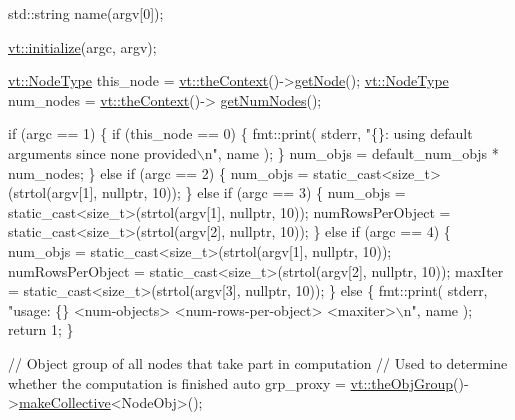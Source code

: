 \begin{DoxyCodeInclude}
  std::string name(argv[0]);

  \hyperlink{namespacevt_aaa266774ea8339c58be0202b00fafa62}{vt::initialize}(argc, argv);

  \hyperlink{namespacevt_a866da9d0efc19c0a1ce79e9e492f47e2}{vt::NodeType} this\_node = \hyperlink{namespacevt_a26551fe0e6e6a1371111df5b12c7e92c}{vt::theContext}()->\hyperlink{structvt_1_1ctx_1_1_context_a0d52c263ce8516546a67443d9a86fa5f}{getNode}();
  \hyperlink{namespacevt_a866da9d0efc19c0a1ce79e9e492f47e2}{vt::NodeType} num\_nodes = \hyperlink{namespacevt_a26551fe0e6e6a1371111df5b12c7e92c}{vt::theContext}()->
      \hyperlink{structvt_1_1ctx_1_1_context_a7f41071aadf6d5fa9e1b6c703c5ff19d}{getNumNodes}();

  \textcolor{keywordflow}{if} (argc == 1) \{
    \textcolor{keywordflow}{if} (this\_node == 0) \{
      fmt::print(
        stderr, \textcolor{stringliteral}{"\{\}: using default arguments since none provided\(\backslash\)n"}, name
      );
    \}
    num\_objs = default\_num\_objs * num\_nodes;
  \} \textcolor{keywordflow}{else} \textcolor{keywordflow}{if} (argc == 2) \{
    num\_objs = \textcolor{keyword}{static\_cast<}\textcolor{keywordtype}{size\_t}\textcolor{keyword}{>}(strtol(argv[1], \textcolor{keyword}{nullptr}, 10));
  \}
  \textcolor{keywordflow}{else} \textcolor{keywordflow}{if} (argc == 3) \{
    num\_objs = \textcolor{keyword}{static\_cast<}\textcolor{keywordtype}{size\_t}\textcolor{keyword}{>}(strtol(argv[1], \textcolor{keyword}{nullptr}, 10));
    numRowsPerObject = \textcolor{keyword}{static\_cast<}\textcolor{keywordtype}{size\_t}\textcolor{keyword}{>}(strtol(argv[2], \textcolor{keyword}{nullptr}, 10));
  \}
  \textcolor{keywordflow}{else} \textcolor{keywordflow}{if} (argc == 4) \{
    num\_objs = \textcolor{keyword}{static\_cast<}\textcolor{keywordtype}{size\_t}\textcolor{keyword}{>}(strtol(argv[1], \textcolor{keyword}{nullptr}, 10));
    numRowsPerObject = \textcolor{keyword}{static\_cast<}\textcolor{keywordtype}{size\_t}\textcolor{keyword}{>}(strtol(argv[2], \textcolor{keyword}{nullptr}, 10));
    maxIter = \textcolor{keyword}{static\_cast<}\textcolor{keywordtype}{size\_t}\textcolor{keyword}{>}(strtol(argv[3], \textcolor{keyword}{nullptr}, 10));
  \}
  \textcolor{keywordflow}{else} \{
    fmt::print(
      stderr, \textcolor{stringliteral}{"usage: \{\} <num-objects> <num-rows-per-object> <maxiter>\(\backslash\)n"},
      name
    );
    \textcolor{keywordflow}{return} 1;
  \}

  \textcolor{comment}{// Object group of all nodes that take part in computation}
  \textcolor{comment}{// Used to determine whether the computation is finished}
  \textcolor{keyword}{auto} grp\_proxy = \hyperlink{namespacevt_a833f0115b692f578167cbd88e30d39c5}{vt::theObjGroup}()->\hyperlink{structvt_1_1objgroup_1_1_obj_group_manager_a651c44a47c6bcdc9f1b6c9e857fa03f2}{makeCollective}<NodeObj>();


\end{DoxyCodeInclude}
